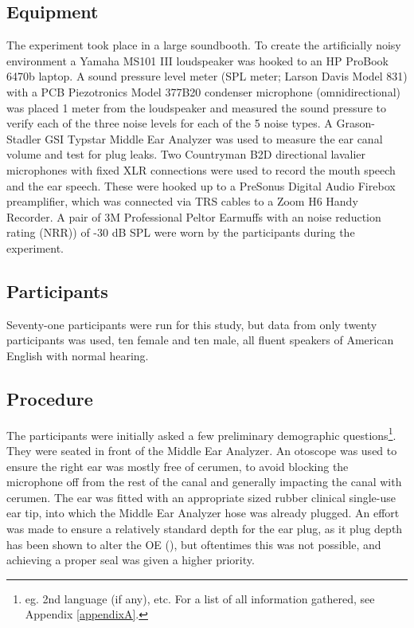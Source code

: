   
\subsection{Equipment}

The experiment took place in a large soundbooth.  To create the artificially noisy environment a Yamaha MS101 III loudspeaker was hooked to an HP ProBook 6470b laptop.  A sound pressure level meter (SPL meter; Larson Davis Model 831) with a PCB Piezotronics Model 377B20 condenser microphone (omnidirectional) was placed 1 meter from the loudspeaker and measured the sound pressure to verify each of the three noise levels for each of the 5 noise types. A Grason-Stadler GSI Typstar Middle Ear Analyzer was used to measure the ear canal volume and test for plug leaks.  Two Countryman B2D directional lavalier microphones with fixed XLR connections were used to record the mouth speech and the ear speech.  These were hooked up to a PreSonus Digital Audio Firebox preamplifier, which was connected via TRS cables to a Zoom H6 Handy Recorder. A pair of 3M Professional Peltor Earmuffs with an noise reduction rating (NRR)) of -30 dB SPL were worn by the participants during the experiment.


\subsection{Participants}
Seventy-one participants were run for this study, but data from only twenty participants was used, ten female and ten male, all fluent speakers of American English with normal hearing.

\subsection{Procedure}\label{chap2:methods:procedure}

The participants were initially asked a few preliminary demographic questions\footnote{eg. 2nd language (if any), etc. For a list of all information gathered, see Appendix \ref{appendixA}.}. They were seated in front of the Middle Ear Analyzer.  An otoscope was used to ensure the right ear was mostly free of cerumen, to avoid blocking the microphone off from the rest of the canal and generally impacting the canal with cerumen.  The ear was fitted with an appropriate sized rubber clinical single-use ear tip, into which the Middle Ear Analyzer hose was already plugged.  An effort was made to ensure a relatively standard depth for the ear plug, as it plug depth has been shown to alter the OE (\cite{dean:00,stenfelt:07}), but oftentimes this was not possible, and achieving a proper seal was given a higher priority.

